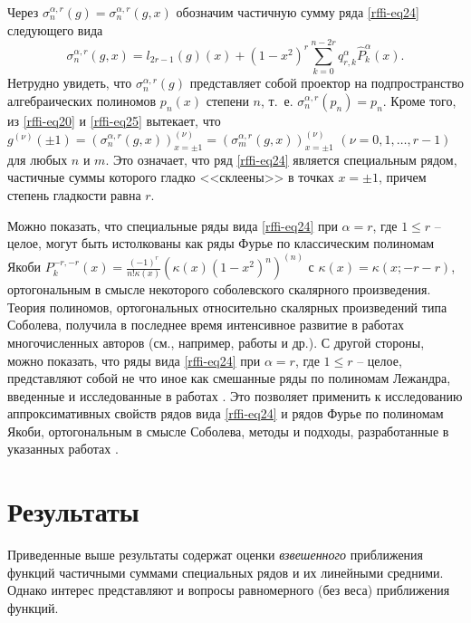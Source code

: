 Через $\sigma_n^{\alpha,r}(g)=\sigma_n^{\alpha,r}(g,x)$ обозначим частичную сумму ряда \eqref{rffi-eq24} следующего вида
\begin{equation}\label{rffi-eq25}
\sigma_n^{\alpha,r}(g,x)=l_{2r-1}(g)(x)+(1-x^2)^r\sum_{k=0}^{n-2r} q_{r,k}^\alpha\hat P_k^\alpha(x).
\end{equation}
Нетрудно увидеть, что $\sigma_n^{\alpha,r}(g)$ представляет собой проектор на подпространство алгебраических полиномов $p_n(x)$ степени $n$, т.~е. $\sigma_n^{\alpha,r}(p_n)=p_n$. Кроме того, из \eqref{rffi-eq20} и \eqref{rffi-eq25} вытекает, что $g^{(\nu)}(\pm1)=(\sigma_n^{\alpha,r}(g,x))^{(\nu)}_{x=\pm1}=(\sigma_m^{\alpha,r}(g,x))^{(\nu)}_{x=\pm1}$ $(\nu=0,1,\ldots, r-1)$ для любых $n$ и $m$. Это означает, что ряд \eqref{rffi-eq24} является специальным рядом, частичные суммы которого гладко <<склеены>>  в точках $x=\pm1$, причем степень гладкости равна $r$.

Можно показать, что специальные ряды вида \eqref{rffi-eq24} при $\alpha=r$, где $1 \le r$ -- целое, могут быть истолкованы как ряды Фурье по классическим полиномам Якоби
$P^{-r,-r}_k(x) = \frac{(-1)^r}{n!\kappa(x)} \left(  \kappa(x)(1-x^2)^n \right)^{(n)}$ с $\kappa(x)=\kappa(x;-r-r)$, ортогональным в смысле некоторого соболевского скалярного произведения. Теория полиномов, ортогональных относительно скалярных произведений типа Соболева, получила в последнее время интенсивное развитие в работах многочисленных авторов (см., например, работы \cite{rffi-35, rffi-36, rffi-37, rffi-38, rffi-39}
и др.). С другой стороны, можно показать, что ряды вида \eqref{rffi-eq24} при $\alpha=r$, где $1 \le r$ -- целое, представляют собой не что иное как смешанные ряды по полиномам Лежандра, введенные и исследованные в работах \cite{rffi-40, rffi-41, rffi-42}.
Это позволяет применить к исследованию аппроксимативных свойств рядов вида \eqref{rffi-eq24} и рядов Фурье по полиномам Якоби, ортогональным в смысле Соболева, методы и подходы, разработанные в указанных работах \cite{rffi-40, rffi-41, rffi-42}.





\section{Результаты}
Приведенные выше результаты содержат оценки \textit{взвешенного} приближения функций частичными суммами специальных рядов и их линейными средними. Однако интерес представляют и вопросы равномерного (без веса) приближения функций.

